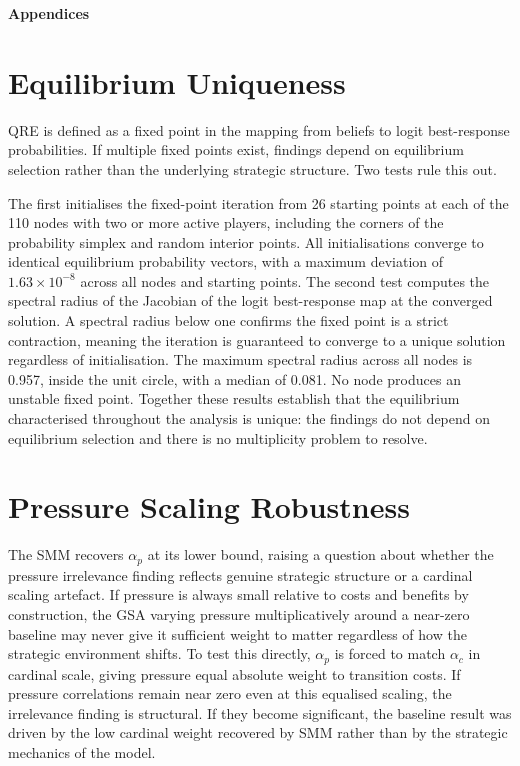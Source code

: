 \documentclass[10pt,a4paper]{article}
\begin{document}
\clearpage
\appendix
{}
{\centering\Large\textbf{Appendices}\par}
\vspace{1.5em}

\needspace{12em}
\section{Equilibrium Uniqueness}

QRE is defined as a fixed point in the mapping from beliefs to logit best-response probabilities. If multiple fixed points exist, findings depend on equilibrium selection rather than the underlying strategic structure. Two tests rule this out.

The first initialises the fixed-point iteration from 26 starting points at each of the 110 nodes with two or
more active players, including the corners of the probability simplex and random interior points. All
initialisations converge to identical equilibrium probability vectors, with a maximum deviation of
$1.63 \times 10^{-8}$ across all nodes and starting points. The second test computes the spectral radius of the
Jacobian of the logit best-response map at the converged solution. A spectral radius below one confirms
the fixed point is a strict contraction, meaning the iteration is guaranteed to converge to a unique solution
regardless of initialisation. The maximum spectral radius across all nodes is 0.957, inside the unit circle,
with a median of 0.081. No node produces an unstable fixed point. Together these results establish that
the equilibrium characterised throughout the analysis is unique: the findings do not depend on equilibrium
selection and there is no multiplicity problem to resolve.

\FloatBarrier

\FloatBarrier

\clearpage
\needspace{12em}
\section{Pressure Scaling Robustness}

The SMM recovers $\alpha_p$ at its lower bound, raising a question about whether the pressure irrelevance
finding reflects genuine strategic structure or a cardinal scaling artefact. If pressure is always small
relative to costs and benefits by construction, the GSA varying pressure multiplicatively around a
near-zero baseline may never give it sufficient weight to matter regardless of how the strategic
environment shifts. To test this directly, $\alpha_p$ is forced to match $\alpha_c$ in cardinal scale, giving pressure
equal absolute weight to transition costs. If pressure correlations remain near zero even at this equalised
scaling, the irrelevance finding is structural. If they become significant, the baseline result was driven by
the low cardinal weight recovered by SMM rather than by the strategic mechanics of the model.
\end{document}
